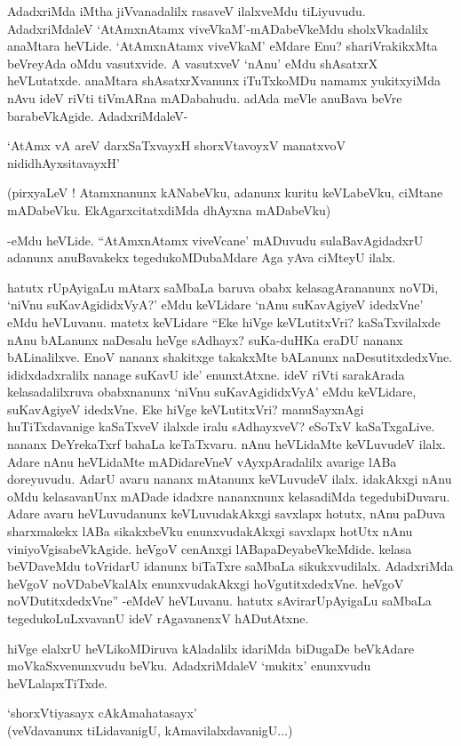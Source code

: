AdadxriMda iMtha jiVvanadalilx rasaveV ilalxveMdu tiLiyuvudu. AdadxriMdaleV `AtAmxnAtamx viveVkaM'-mADabeVkeMdu sholxVkadalilx anaMtara heVLide. `AtAmxnAtamx viveVkaM' eMdare Enu? shariVrakikxMta beVreyAda oMdu vasutxvide. A vasutxveV `nAnu' eMdu shAsatxrX heVLutatxde. anaMtara shAsatxrXvanunx iTuTxkoMDu namamx yukitxyiMda nAvu ideV riVti tiVmARna mADabahudu. adAda meVle anuBava beVre barabeVkAgide. AdadxriMdaleV-

\begin{shloka}
`AtAmx vA areV darxSaTxvayxH shorxVtavoyxV manatxvoV nididhAyxsitavayxH'
\end{shloka}

(pirxyaLeV ! Atamxnanunx kANabeVku, adanunx kuritu keVLabeVku, ciMtane mADabeVku. EkAgarxcitatxdiMda dhAyxna mADabeVku)

-eMdu heVLide. ``AtAmxnAtamx viveVcane' mADuvudu sulaBavAgidadxrU adanunx anuBavakekx tegedukoMDubaMdare Aga yAva ciMteyU ilalx.

hatutx rUpAyigaLu mAtarx saMbaLa baruva obabx kelasagArananunx noVDi, `niVnu suKavAgididxVyA?' eMdu keVLidare `nAnu suKavAgiyeV idedxVne' eMdu heVLuvanu. matetx keVLidare ``Eke hiVge keVLutitxVri? kaSaTxvilalxde nAnu bALanunx naDesalu heVge sAdhayx? suKa-duHKa eraDU nananx bALinalilxve. EnoV nananx shakitxge takakxMte bALanunx naDesutitxdedxVne. ididxdadxralilx nanage suKavU ide' enunxtAtxne. ideV riVti sarakArada kelasadalilxruva obabxnanunx `niVnu suKavAgididxVyA' eMdu keVLidare, suKavAgiyeV idedxVne. Eke hiVge keVLutitxVri? manuSayxnAgi huTiTxdavanige kaSaTxveV ilalxde iralu sAdhayxveV? eSoTxV kaSaTxgaLive. nananx DeYrekaTxrf bahaLa keTaTxvaru. nAnu heVLidaMte keVLuvudeV ilalx. Adare nAnu heVLidaMte mADidareVneV vAyxpAradalilx avarige lABa doreyuvudu. AdarU avaru nananx mAtanunx keVLuvudeV ilalx. idakAkxgi nAnu oMdu kelasavanUnx mADade idadxre nananxnunx kelasadiMda tegedubiDuvaru. Adare avaru heVLuvudanunx keVLuvudakAkxgi savxlapx hotutx, nAnu paDuva sharxmakekx lABa sikakxbeVku enunxvudakAkxgi savxlapx hotUtx nAnu viniyoVgisabeVkAgide. heVgoV cenAnxgi lABapaDeyabeVkeMdide. kelasa beVDaveMdu toVridarU idanunx biTaTxre saMbaLa sikukxvudilalx. AdadxriMda heVgoV noVDabeVkalAlx enunxvudakAkxgi hoVgutitxdedxVne. heVgoV noVDutitxdedxVne'' -eMdeV heVLuvanu. hatutx sAvirarUpAyigaLu saMbaLa tegedukoLuLxvavanU ideV rAgavanenxV hADutAtxne.

hiVge elalxrU heVLikoMDiruva kAladalilx idariMda biDugaDe beVkAdare moVkaSxvenunxvudu beVku. AdadxriMdaleV `mukitx' enunxvudu heVLalapxTiTxde.

\begin{shloka}
`shorxVtiyasayx cAkAmahatasayx'\\
(veVdavanunx tiLidavanigU, kAmavilalxdavanigU$\ldots$)
\end{shloka}

